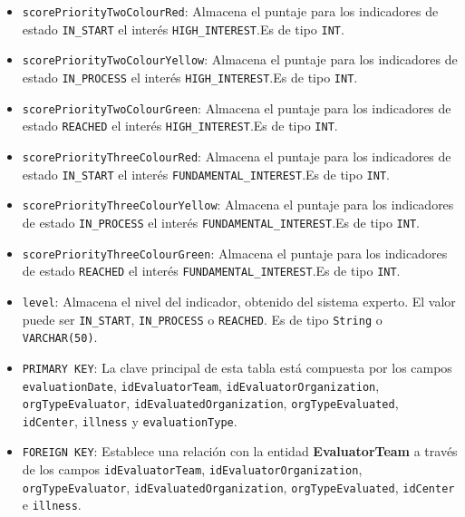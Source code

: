 \begin{itemize}
\begin{itemize}
      \item \texttt{scorePriorityTwoColourRed}: Almacena el puntaje para los indicadores de estado \texttt{IN\_START} el interés \texttt{HIGH\_INTEREST}.Es de tipo \texttt{INT}.
      \item \texttt{scorePriorityTwoColourYellow}: Almacena el puntaje para los indicadores de estado \texttt{IN\_PROCESS} el interés \texttt{HIGH\_INTEREST}.Es de tipo \texttt{INT}.
      \item \texttt{scorePriorityTwoColourGreen}: Almacena el puntaje para los indicadores de estado \texttt{REACHED} el interés \texttt{HIGH\_INTEREST}.Es de tipo \texttt{INT}.
      \item \texttt{scorePriorityThreeColourRed}: Almacena el puntaje para los indicadores de estado \texttt{IN\_START} el interés \texttt{FUNDAMENTAL\_INTEREST}.Es de tipo \texttt{INT}.
      \item \texttt{scorePriorityThreeColourYellow}: Almacena el puntaje para los indicadores de estado \texttt{IN\_PROCESS} el interés \texttt{FUNDAMENTAL\_INTEREST}.Es de tipo \texttt{INT}.
      \item \texttt{scorePriorityThreeColourGreen}: Almacena el puntaje para los indicadores de estado \texttt{REACHED} el interés \texttt{FUNDAMENTAL\_INTEREST}.Es de tipo \texttt{INT}.
      \item \texttt{level}: Almacena el nivel del indicador, obtenido del sistema experto. El valor puede ser \texttt{IN\_START}, \texttt{IN\_PROCESS} o \texttt{REACHED}. Es de tipo \texttt{String} o \texttt{VARCHAR(50)}.
      \item \texttt{PRIMARY KEY}: La clave principal de esta tabla está compuesta por los campos \texttt{evaluationDate}, \texttt{idEvaluatorTeam}, \texttt{idEvaluatorOrganization}, \texttt{orgTypeEvaluator}, \texttt{idEvaluatedOrganization}, \texttt{orgTypeEvaluated}, \texttt{idCenter}, \texttt{illness} y \texttt{evaluationType}.
      \item \texttt{FOREIGN KEY}: Establece una relación con la entidad \textbf{EvaluatorTeam} a través de los campos \texttt{idEvaluatorTeam}, \texttt{idEvaluatorOrganization}, \texttt{orgTypeEvaluator}, \texttt{idEvaluatedOrganization}, \texttt{orgTypeEvaluated}, \texttt{idCenter} e \texttt{illness}.
    \end{itemize}
    




\end{itemize}

